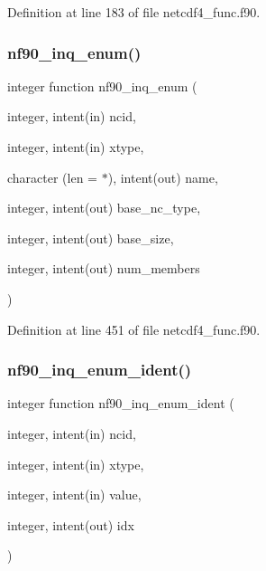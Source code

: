 Definition at line 183 of file netcdf4\+\_\+func.\+f90.

\mbox{\label{netcdf4__func_8f90_a9094e88c1530acf69c39772d1b6665c8}} 
\subsubsection{\texorpdfstring{nf90\+\_\+inq\+\_\+enum()}{nf90\_inq\_enum()}}
{\footnotesize\ttfamily integer function nf90\+\_\+inq\+\_\+enum (\begin{DoxyParamCaption}\item[{integer, intent(in)}]{ncid,  }\item[{integer, intent(in)}]{xtype,  }\item[{character (len = $\ast$), intent(out)}]{name,  }\item[{integer, intent(out)}]{base\+\_\+nc\+\_\+type,  }\item[{integer, intent(out)}]{base\+\_\+size,  }\item[{integer, intent(out)}]{num\+\_\+members }\end{DoxyParamCaption})}



Definition at line 451 of file netcdf4\+\_\+func.\+f90.

\mbox{\label{netcdf4__func_8f90_aaad2b2da3ef4041a31bf300453bddeb0}} 
\subsubsection{\texorpdfstring{nf90\+\_\+inq\+\_\+enum\+\_\+ident()}{nf90\_inq\_enum\_ident()}}
{\footnotesize\ttfamily integer function nf90\+\_\+inq\+\_\+enum\+\_\+ident (\begin{DoxyParamCaption}\item[{integer, intent(in)}]{ncid,  }\item[{integer, intent(in)}]{xtype,  }\item[{integer, intent(in)}]{value,  }\item[{integer, intent(out)}]{idx }\end{DoxyParamCaption})}



